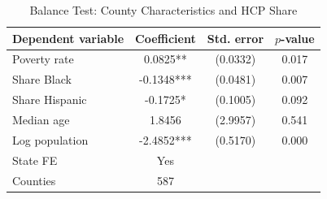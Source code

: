 \begin{table}[t]
\centering
\caption{Balance Test: County Characteristics and HCP Share}
\label{tab:balance}
\small
\begin{tabular}{lccc}
\hline\hline
  Dependent variable & Coefficient & Std. error & $p$-value \\
\hline
  Poverty rate & 0.0825** & (0.0332) & 0.017 \\
  Share Black & -0.1348*** & (0.0481) & 0.007 \\
  Share Hispanic & -0.1725* & (0.1005) & 0.092 \\
  Median age & 1.8456 & (2.9957) & 0.541 \\
  Log population & -2.4852*** & (0.5170) & 0.000 \\
\hline
  State FE & Yes & & \\
  Counties & 587 & & \\
\hline\hline
\end{tabular}
\par{}
\end{table}
